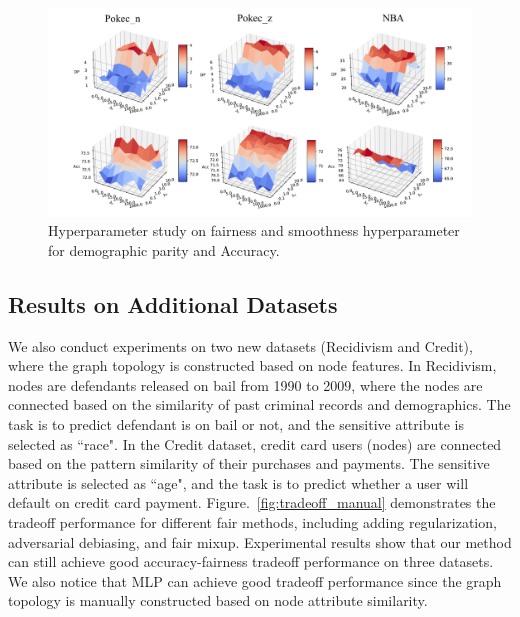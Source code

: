 \documentclass[letterpaper]{article} %
\theoremstyle{plain}
\theoremstyle{definition}
\theoremstyle{remark}
\begin{document}
\begin{figure}[t]
\centering
\includegraphics[width=0.9\linewidth]{Hyper_all.pdf}

\caption{Hyperparameter study on fairness and smoothness hyperparameter for demographic parity and Accuracy.}
\label{fig:hyper}
\end{figure}

\subsection{Results on Additional Datasets}

We also conduct experiments on two new datasets (Recidivism and Credit), where the graph topology is constructed based on node features.  In Recidivism, nodes are defendants
released on bail from 1990 to 2009, where the nodes are connected based on
the similarity of past criminal records and demographics. The task
is to predict defendant is on bail or not, and the
sensitive attribute is selected as ``race". In the Credit dataset, credit card
users (nodes) are connected based on the pattern similarity of
their purchases and payments. The sensitive attribute is selected as ``age", 
and the task is to predict whether a user will default on credit card payment. 
Figure.~\ref{fig:tradeoff_manual} demonstrates the tradeoff performance for different fair methods, including adding regularization, adversarial debiasing, and fair mixup.
Experimental results show that our method can still achieve good accuracy-fairness tradeoff performance on three datasets. We also notice that MLP can achieve good tradeoff performance since the graph topology is manually constructed based on node attribute similarity.
\end{document}
